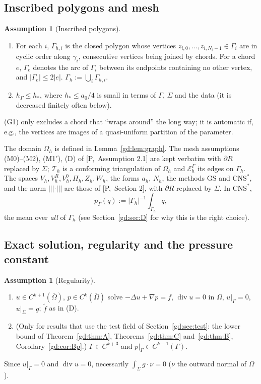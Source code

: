 \documentclass[11pt,reqno]{amsart}
\theoremstyle{plain}
\theoremstyle{definition}
\newtheorem{assumption}[theorem]{Assumption}
\newcommand{\hG}{h_\Gamma}
\newcommand{\Gh}{\Gamma_h}
\newcommand{\Oh}{\Omega_h}
\newcommand{\Th}{\mathcal T_h}
\newcommand{\EG}{\mathcal E_h^\Gamma}
\newcommand{\Vh}{V_h}
\newcommand{\VR}{V_h^R}
\newcommand{\VO}{V_h^0}
\newcommand{\Pih}{\Pi_h}
\newcommand{\Zh}{Z_h}
\newcommand{\Wh}{W_h}
\newcommand{\ft}{\tilde f}
\newcommand{\pbG}{\bar p_{\Gamma}}
\newcommand{\tnorm}[1]{|\!|\!|#1|\!|\!|}
\newcommand{\GS}{\mathrm{GS}}
\newcommand{\CNS}{\mathrm{CNS}^\ast}
\renewcommand{\div}{\operatorname{div}}
\newcommand{\Pref}[1]{\textup{[P,~#1]}}
\begin{document}
\subsection{Inscribed polygons and mesh}
\begin{assumption}[Inscribed polygons]\label{gd:ass:poly}
\leavevmode
\begin{enumerate}[label=(G\arabic*)]
\item For each $i$, $\Gamma_{h,i}$ is the closed polygon whose vertices $z_{i,0},\dots,z_{i,N_i-1}\in\Gamma_i$ are in cyclic order along $\gamma_i$, consecutive vertices being joined by chords. For a chord $e$, $\Gamma_e$ denotes the arc of $\Gamma_i$ between its endpoints containing no other vertex, and $|\Gamma_e|\le2|e|$. $\Gh:=\bigcup_i\Gamma_{h,i}$.
\item $\hG\le h_\ast$, where $h_\ast\le a_0/4$ is small in terms of $\Gamma$, $\Sigma$ and the data (it is decreased finitely often below).
\end{enumerate}
\end{assumption}
(G1) only excludes a chord that ``wraps around'' the long way; it is automatic if, e.g., the vertices are images of a quasi-uniform partition of the parameter.

The domain $\Oh$ is defined in Lemma~\ref{gd:lem:graph}. The mesh assumptions (M0)--(M2), (M1$'$), (D) of \Pref{Assumption 2.1} are kept verbatim with $\partial R$ replaced by $\Sigma$; $\Th$ is a conforming triangulation of $\Oh$ and $\EG$ its edges on $\Gh$. The spaces $\Vh,\VR,\VO,\Pih,\Zh,\Wh$, the forms $a_h$, $N_h$, the methods $\GS$ and $\CNS$, and the norm $\tnorm\cdot$ are those of \Pref{Section 2}, with $\partial R$ replaced by $\Sigma$. In $\CNS$,
\[
\pbG(q):=|\Gh|^{-1}\int_{\Gh}q,
\]
the mean over \emph{all} of $\Gh$ (see Section~\ref{gd:sec:D} for why this is the right choice).

\subsection{Exact solution, regularity and the pressure constant}
\begin{assumption}[Regularity]\label{gd:ass:reg}
\leavevmode
\begin{enumerate}[label=(R\arabic*)]
\item $u\in C^{k+1}(\overline\Omega)$, $p\in C^{k}(\overline\Omega)$ solve $-\Delta u+\nabla p=f$, $\div u=0$ in $\Omega$, $u|_\Gamma=0$, $u|_\Sigma=g$; $\ft$ as in (D).
\item (Only for results that use the test field of Section~\ref{gd:sec:test}: the lower bound of Theorem~\ref{gd:thm:A}, Theorems~\ref{gd:thm:C} and~\ref{gd:thm:B}, Corollary~\ref{gd:cor:Bp}.) $\Gamma\in C^{k+3}$ and $p|_\Gamma\in C^{k+1}(\Gamma)$.
\end{enumerate}
\end{assumption}
Since $u|_\Gamma=0$ and $\div u=0$, necessarily $\int_\Sigma g\cdot\nu=0$ ($\nu$ the outward normal of $\Omega$).
\end{document}
